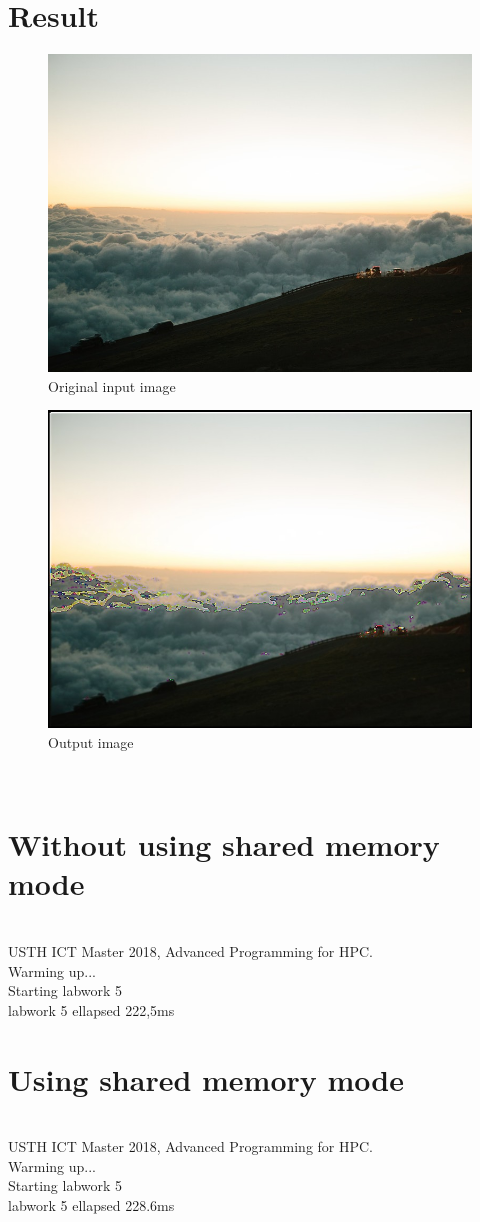 \documentclass{article}
\begin{document}
\section*{Result}
\begin{figure}[h]
\center\includegraphics[scale=0.3]{./labwork/data/cloud.jpeg}
\caption{Original input image}
\end{figure}
\begin{figure}[h]
\center\includegraphics[scale=0.3]{./labwork/build/labwork5-gpu-out-shared.jpg}
\caption{Output image}
\end{figure}
\\
\section*{Without using shared memory mode}
\\
USTH ICT Master 2018, Advanced Programming for HPC.
\\
Warming up...
\\
Starting labwork 5
\\
labwork 5 ellapsed 222,5ms
\\
\section*{Using shared memory mode}
\\
USTH ICT Master 2018, Advanced Programming for HPC.
\\
Warming up...
\\
Starting labwork 5
\\
labwork 5 ellapsed 228.6ms
\end{document}
